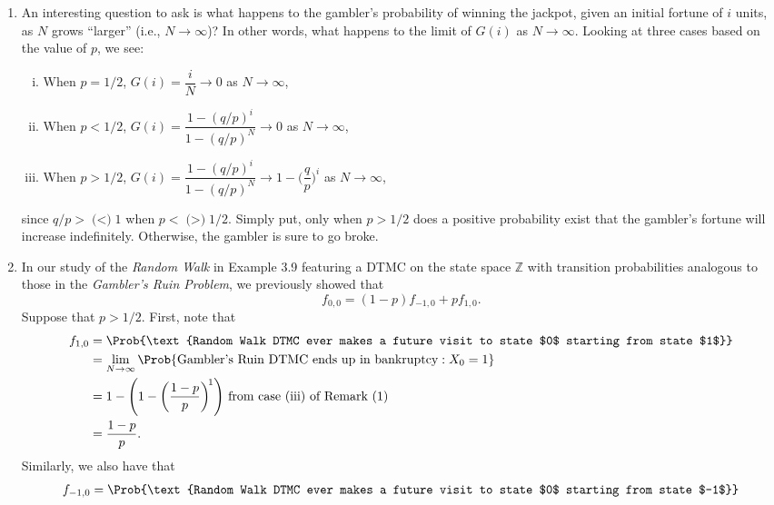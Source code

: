 \begin{enumerate}[(1)]
    \item An interesting question to ask is what happens to the gambler's probability of winning the
          jackpot, given an initial fortune of $i$ units, as $N$ grows ``larger'' (i.e., $ N\to\infty $)? In other
          words, what happens to the limit of $G(i)$ as $ N\to\infty $. Looking at three cases based on
          the value of $p$, we see:
          \begin{enumerate}[(i)]
              \item When $ p=1/2 $, $ G(i)=\dfrac{i}{N} \to 0 $ as $ N\to\infty $,
              \item When $ p<1/2 $, $ G(i)=\dfrac{1-(q/p)^i}{1-(q/p)^N}\to 0 $ as $ N\to\infty $,
              \item When $ p>1/2 $, $ G(i)=\dfrac{1-(q/p)^i}{1-(q/p)^N}\to 1-\biggl(\dfrac{q}{p}\biggr)^{\! i} $ as $ N\to\infty $,
          \end{enumerate}
          since $ q/p>\text{($<$)}1 $ when $ p<\text{($>$)}1/2 $. Simply put, only when $ p>1/2 $ does a positive
          probability exist that the gambler's fortune will increase indefinitely. Otherwise, the
          gambler is sure to go broke.
    \item In our study of the \emph{Random Walk} in Example 3.9 featuring a DTMC on the state space $ \mathbb{Z} $
          with transition probabilities analogous to those in the \emph{Gambler's Ruin Problem}, we
          previously showed that
          \[ f_{0,0}=(1-p)f_{-1,0}+pf_{1,0}. \]
          Suppose that $ p>1/2 $. First, note that
          \begin{align*}
              f_{1,0}
               & =\Prob{\text{Random Walk DTMC ever makes a future visit to state $0$ starting from state $1$}}     \\
               & =\lim\limits_{{N} \to {\infty}}\Prob{\text{Gambler's Ruin DTMC ends up in bankruptcy}\given X_0=1} \\
               & =1-\Biggl(1-\biggl(\frac{1-p}{p} \biggr)^{\!1}\Biggr)\text{ from case (iii) of Remark (1)}         \\
               & =\frac{1-p}{p}.
          \end{align*}
          Similarly, we also have that
          \begin{align*}
              f_{-1,0}
               & =\Prob{\text{Random Walk DTMC ever makes a future visit to state $0$ starting from state $-1$}}                                  \\

\end{align*}
\end{enumerate}
